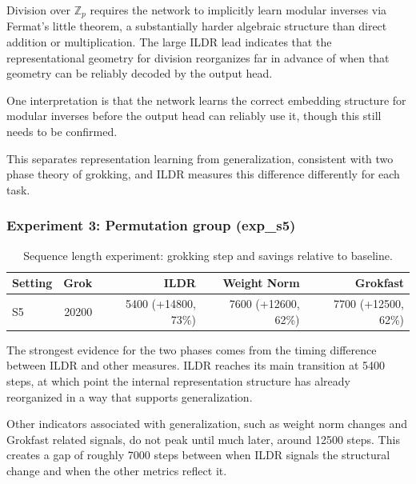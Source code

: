 \documentclass{article}
\begin{document}
\vspace{3pt}

Division over 
$\mathbb{Z}_p$ requires the network to implicitly learn modular inverses via Fermat's little theorem, a substantially harder algebraic structure than direct addition or multiplication. The large ILDR lead indicates that the representational geometry for division reorganizes far in advance of when that geometry can be reliably decoded by the output head.  

\vspace{3pt}

One interpretation is that the network learns the correct embedding structure for modular inverses before the output head can reliably use it, though this still needs to be confirmed.

\vspace{3pt}
This separates representation learning from generalization, consistent with two phase theory of grokking, and ILDR measures this difference differently for each task. 


\subsubsection{Experiment 3: Permutation group (exp\_s5)}

\begin{table}[H]
\centering
\begin{tabular}{lrrrr}
\hline
Setting & Grok & ILDR & Weight Norm & Grokfast \\
\hline
S5 & 20200 & 5400 (+14800, 73\%) & 7600 (+12600, 62\%) & 7700 (+12500, 62\%) \\
\hline
\end{tabular}
\caption{Sequence length experiment: grokking step and savings relative to baseline.}
\label{tab:s5}
\end{table}

The strongest evidence for the two phases comes from the timing difference between ILDR and other measures. ILDR reaches its main transition at 5400 steps, at which point the internal representation structure has already reorganized in a way that supports generalization. 

\vspace{3pt}

Other indicators associated with generalization, such as weight norm changes and Grokfast related signals, do not peak until much later, around 12500 steps. This creates a gap of roughly 7000 steps between when ILDR signals the structural change and when the other metrics reflect it. 
\end{document}

